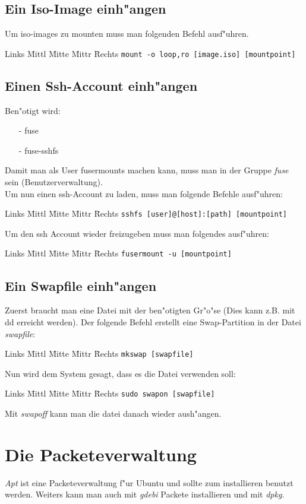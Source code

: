 \documentclass[12pt]{article}
\newenvironment{code}{\begin{tabbing}Links \= Mittl \= Mitte \= Mittr \= Rechts \kill}{\end{tabbing}}
\begin{document}
\subsection{Ein Iso-Image einh"angen}
Um iso-images zu mounten muss man folgenden Befehl ausf"uhren.
\begin{code}
	\> \verb#mount -o loop,ro [image.iso] [mountpoint]#
\end{code}
\subsection{Einen Ssh-Account einh"angen}
Ben"otigt wird:
\begin{itemize}
	\item[-] fuse
	\item[-] fuse-sshfs
\end{itemize}
Damit man als User fusermounts machen kann, muss man in der Gruppe \textit{fuse} 
sein (Benutzerverwaltung).\\
Um nun einen ssh-Account zu laden, muss man folgende Befehle ausf"uhren:
\begin{code}
	\> \verb#sshfs [user]@[host]:[path] [mountpoint]#
\end{code}
Um den ssh Account wieder freizugeben muss man folgendes ausf"uhren:
\begin{code}
	\> \verb#fusermount -u [mountpoint]#
\end{code}
\subsection{Ein Swapfile einh"angen}
Zuerst braucht man eine Datei mit der ben"otigten Gr"o"se (Dies kann z.B. mit dd erreicht werden).
Der folgende Befehl erstellt eine Swap-Partition in der Datei \textit{swapfile}:
\begin{code}
	\> \verb#mkswap [swapfile]#
\end{code}
Nun wird dem System gesagt, dass es die Datei verwenden soll:
\begin{code}
	\> \verb#sudo swapon [swapfile]#
\end{code}
Mit \textit{swapoff} kann man die datei danach wieder aush"angen.

\section{Die Packeteverwaltung}
\textit{Apt} ist eine Packeteverwaltung f"ur Ubuntu und sollte zum installieren benutzt werden.
Weiters kann man auch mit \textit{gdebi} Packete installieren und mit \textit{dpkg}.
\end{document}
